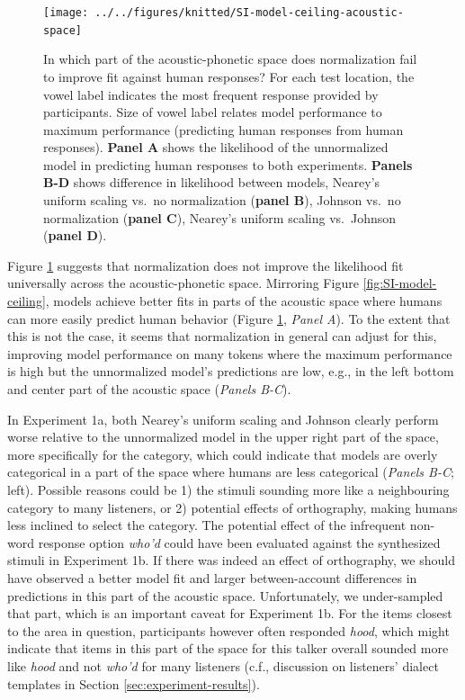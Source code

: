 \documentclass[preprint]{JASA}
\begin{document}
\begin{figure}

{\centering \texttt{[image: ../../figures/knitted/SI-model-ceiling-acoustic-space]} 

}

\caption{In which part of the acoustic-phonetic space does normalization fail to improve fit against human responses? For each test location, the vowel label indicates the most frequent response provided by participants. Size of vowel label relates model performance to maximum performance (predicting human responses from human responses). \textbf{Panel A} shows the likelihood of the unnormalized model in predicting human responses to both experiments. \textbf{Panels B-D} shows difference in likelihood between models, Nearey's uniform scaling vs.~no normalization (\textbf{panel B}), Johnson vs.~no normalization (\textbf{panel C}), Nearey's uniform scaling vs.~Johnson (\textbf{panel D}).}\label{fig:SI-model-ceiling-acoustic-space}
\end{figure}

Figure \ref{fig:SI-model-ceiling-acoustic-space} suggests that normalization does not improve the likelihood fit universally across the acoustic-phonetic space. Mirroring Figure \ref{fig:SI-model-ceiling}, models achieve better fits in parts of the acoustic space where humans can more easily predict human behavior (Figure \ref{fig:SI-model-ceiling-acoustic-space}, \emph{Panel A}). To the extent that this is not the case, it seems that normalization in general can adjust for this, improving model performance on many tokens where the maximum performance is high but the unnormalized model's predictions are low, e.g., in the left bottom and center part of the acoustic space (\emph{Panels B-C}).

In Experiment 1a, both Nearey's uniform scaling and Johnson clearly perform worse relative to the unnormalized model in the upper right part of the space, more specifically for the \ipatext{[u]} category, which could indicate that models are overly categorical in a part of the space where humans are less categorical (\emph{Panels B-C}; left). Possible reasons could be 1) the stimuli sounding more like a neighbouring category to many listeners, or 2) potential effects of orthography, making humans less inclined to select the \ipatext{[u]} category. The potential effect of the infrequent non-word response option \emph{who'd} could have been evaluated against the synthesized stimuli in Experiment 1b. If there was indeed an effect of orthography, we should have observed a better model fit and larger between-account differences in predictions in this part of the acoustic space. Unfortunately, we under-sampled that part, which is an important caveat for Experiment 1b. For the items closest to the area in question, participants however often responded \emph{hood}, which might indicate that items in this part of the space for this talker overall sounded more like \emph{hood} and not \emph{who'd} for many listeners (c.f., discussion on listeners' dialect templates in Section \ref{sec:experiment-results}).
\end{document}
